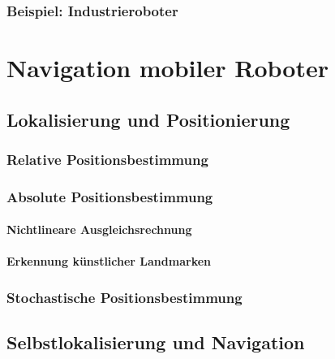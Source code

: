 \documentclass[a4paper, 11pt, accentcolor = tud3b]{tudreport}
\begin{document}
			\subsection{Beispiel: Industrieroboter} %

	\chapter{Navigation mobiler Roboter} %

		\section{Lokalisierung und Positionierung} %

			\subsection{Relative Positionsbestimmung} %

			\subsection{Absolute Positionsbestimmung} %

				\subsubsection{Nichtlineare Ausgleichsrechnung} %

				\subsubsection{Erkennung künstlicher Landmarken} %

			\subsection{Stochastische Positionsbestimmung} %

		\section{Selbstlokalisierung und Navigation} %
\end{document}

